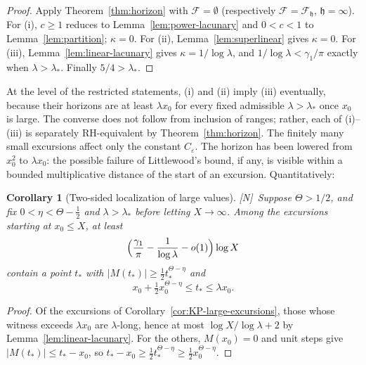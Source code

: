 \documentclass[11pt,reqno]{amsart}
\numberwithin{equation}{section}
\theoremstyle{plain}
\newtheorem{corollary}[theorem]{Corollary}
\theoremstyle{definition}
\theoremstyle{remark}
\newcommand{\eps}{\varepsilon}
\newcommand{\F}{\mathcal{F}}
\newcommand{\tagN}{\textup{[N]}}
\begin{document}
\begin{proof}
Apply Theorem~\ref{thm:horizon} with $\F=\emptyset$ (respectively
$\F=\F_{\mathfrak h}$, $\mathfrak h=\infty$). For (i), $c\ge1$ reduces to
Lemma~\ref{lem:power-lacunary} and $0<c<1$ to Lemma~\ref{lem:partition};
$\kappa=0$. For (ii), Lemma~\ref{lem:superlinear} gives $\kappa=0$. For
(iii), Lemma~\ref{lem:linear-lacunary} gives $\kappa=1/\log\lambda$, and
$1/\log\lambda<\gamma_1/\pi$ exactly when $\lambda>\lambda_*$. Finally
$5/4>\lambda_*$.
\end{proof}

At the level of the restricted statements, (i) and (ii) imply (iii)
eventually, because their horizons are at least $\lambda x_0$ for every
fixed admissible $\lambda>\lambda_*$ once $x_0$ is large.  The converse
does not follow from inclusion of ranges; rather, each of (i)--(iii) is
separately RH-equivalent by Theorem~\ref{thm:horizon}.  The finitely many
small excursions affect only the constant $C_\eps$. The horizon has
been lowered from $x_0^2$ to $\lambda x_0$: the possible failure of
Littlewood's bound, if any, is visible within a bounded multiplicative
distance of the start of an excursion. Quantitatively:

\begin{corollary}[Two-sided localization of large values]
\label{cor:two-sided}
\tagN\ Suppose $\Theta>1/2$, and fix $0<\eta<\Theta-\frac12$ and
$\lambda>\lambda_*$ before letting $X\to\infty$.
Among the excursions starting at $x_0\le X$, at least
\begin{equation}
\Bigl(\frac{\gamma_1}{\pi}-\frac1{\log\lambda}-o(1)\Bigr)\log X
\end{equation}
contain a point $t_*$ with $|M(t_*)|\ge\frac12t_*^{\Theta-\eta}$ and
\begin{equation}
x_0+\tfrac12x_0^{\Theta-\eta}\le t_*\le\lambda x_0 .
\end{equation}
\end{corollary}

\begin{proof}
Of the excursions of Corollary~\ref{cor:KP-large-excursions}, those whose
witness exceeds $\lambda x_0$ are $\lambda$-long, hence at most
$\log X/\log\lambda+2$ by Lemma~\ref{lem:linear-lacunary}. For the others,
$M(x_0)=0$ and unit steps give $|M(t_*)|\le t_*-x_0$, so
$t_*-x_0\ge\frac12t_*^{\Theta-\eta}\ge\frac12x_0^{\Theta-\eta}$.
\end{proof}
\end{document}
